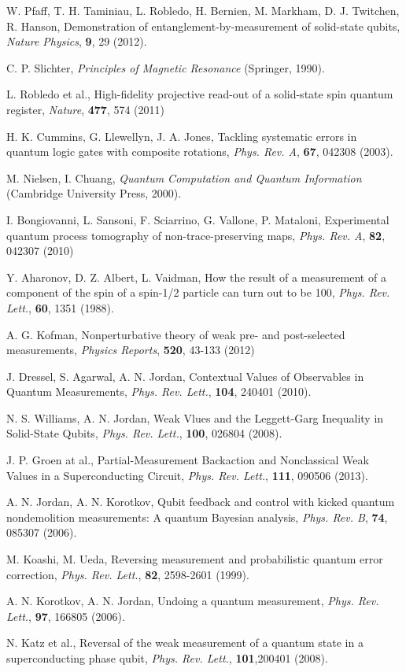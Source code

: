 \documentclass[12pt]{article}
\begin{document}
\begin{thebibliography}{9}

 W. Pfaff, T. H. Taminiau, L. Robledo, H. Bernien, M. Markham, D. J. Twitchen, R. Hanson, Demonstration of entanglement-by-measurement of solid-state qubits, \emph{Nature Physics}, \textbf{9}, 29 (2012).

 C. P. Slichter, \emph{Principles of Magnetic Resonance} (Springer, 1990).

 L. Robledo et al., High-fidelity projective read-out of a solid-state spin quantum register, \emph{Nature}, \textbf{477}, 574 (2011)

 H. K. Cummins, G. Llewellyn, J. A. Jones, Tackling systematic errors in quantum logic gates with composite rotations, \emph{Phys. Rev. A}, \textbf{67}, 042308 (2003).

 M. Nielsen, I. Chuang, \emph{Quantum Computation and Quantum Information} (Cambridge University Press, 2000).

 I. Bongiovanni, L. Sansoni, F. Sciarrino, G. Vallone, P. Mataloni, Experimental quantum process tomography of non-trace-preserving maps, \emph{Phys. Rev. A}, \textbf{82}, 042307 (2010)

 Y. Aharonov, D. Z. Albert, L. Vaidman, How the result of a measurement of a component of the spin of a spin-1/2 particle can turn out to be 100, \emph{Phys. Rev. Lett.}, \textbf{60}, 1351 (1988).

 A. G. Kofman, Nonperturbative theory of weak pre- and post-selected measurements, \emph{Physics Reports}, \textbf{520}, 43-133 (2012)

 J. Dressel, S. Agarwal, A. N. Jordan, Contextual Values of Observables in Quantum Measurements, \emph{Phys. Rev. Lett.}, \textbf{104}, 240401 (2010).

 N. S. Williams, A. N. Jordan, Weak Vlues and the Leggett-Garg Inequality in Solid-State Qubits, \emph{Phys. Rev. Lett.}, \textbf{100}, 026804 (2008).

 J. P. Groen at al., Partial-Measurement Backaction and Nonclassical Weak Values in a Superconducting Circuit, \emph{Phys. Rev. Lett.}, \textbf{111}, 090506 (2013).

 A. N. Jordan, A. N. Korotkov, Qubit feedback and control with kicked quantum nondemolition measurements:
A quantum Bayesian analysis, \emph{Phys. Rev. B}, \textbf{74}, 085307 (2006).

 M. Koashi, M. Ueda, Reversing measurement and probabilistic quantum error correction, \emph{Phys. Rev. Lett.}, \textbf{82}, 2598-2601 (1999).

 A. N. Korotkov, A. N. Jordan, Undoing a quantum measurement, \emph{Phys. Rev. Lett.}, \textbf{97}, 166805 (2006).

 N. Katz et al., Reversal of the weak measurement of a quantum state in a superconducting phase qubit, \emph{Phys. Rev. Lett.}, \textbf{101},200401 (2008).


\end{thebibliography}
\end{document}
